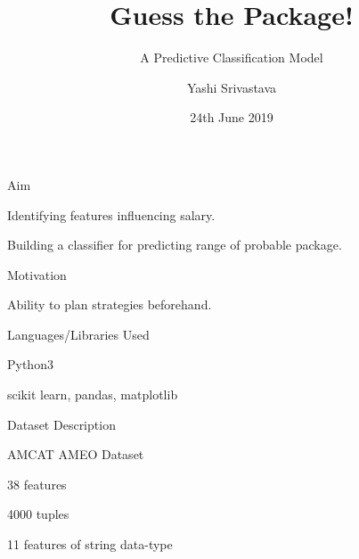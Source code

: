 \documentclass[14pt]{beamer}
\title{Guess the Package!}
\subtitle{A Predictive Classification Model}
\author{Yashi Srivastava}
\institute{Talentsprint}
\date{24th June 2019}
\begin{document}
\begin{frame}[plain]
\maketitle
\end{frame}

\begin{frame}{Aim}
 \begin{fullpageitemize}
  \item \begin{center}Identifying features influencing salary.\end{center}
  \pause
  \item \begin{center}Building a classifier for predicting range of probable package.\end{center}
 \end{fullpageitemize}
\end{frame}

\begin{frame}{Motivation}
\pause
 \begin{fullpageitemize}
  \item \begin{center}
  Ability to plan strategies beforehand.\end{center}
 \end{fullpageitemize}
\end{frame}
\begin{frame}{Languages/Libraries Used}
\pause
 \begin{fullpageitemize}
  \item\begin{center} Python3 \end{center}
  \item\begin{center}  \end{center}
  \item\begin{center} scikit learn, pandas, matplotlib\end{center}
 \end{fullpageitemize}
\end{frame}
\begin{frame}{Dataset Description}
\pause
 \begin{fullpageitemize}
  \item\begin{center} AMCAT AMEO Dataset \end{center}
  \item\begin{center} 38 features \end{center}
  \item\begin{center} 4000 tuples \end{center}
  \item\begin{center} 11 features of string data-type\end{center}
 \end{fullpageitemize}
\end{frame}
\end{document}
